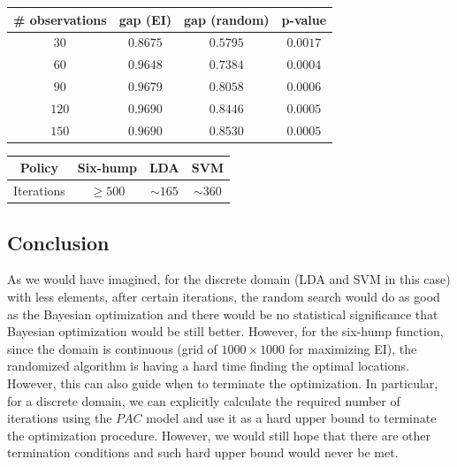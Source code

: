 \documentclass[12pt,a4paper]{article}
\begin{document}
\begin{center}
\begin{tabular}{|c|c|c|c|}
\hline
\# observations & gap (EI) & gap (random) & p-value \\
\hline
 $30$ & $0.8675$ & $0.5795$ & $0.0017$ \\
\hline
 $60$ & $0.9648$ & $0.7384$ & $0.0004$ \\
\hline
 $90$ & $0.9679$ & $0.8058$ & $0.0006$ \\
\hline
$120$ & $0.9690$ & $0.8446$ & $0.0005$ \\
\hline
$150$ & $0.9690$ & $0.8530$ & $0.0005$ \\
\hline
\end{tabular}
\end{center}

\begin{center}
\begin{tabular}{|c|c|c|c|}
\hline
Policy & Six-hump & LDA & SVM \\
\hline
Iterations & $\geq500$ & $\sim165$ & $\sim360$ \\
\hline
\end{tabular}
\end{center}

\subsection{Conclusion}
As we would have imagined, for the discrete domain (LDA and SVM in this case) with less elements, after certain iterations, the random search would do as good as the Bayesian optimization and there would be no statistical significance that Bayesian optimization would be still better. However, for the six-hump function, since the domain is continuous (grid of $1000\times1000$ for maximizing EI), the randomized algorithm is having a hard time finding the optimal locations. \\
However, this can also guide when to terminate the optimization. In particular, for a discrete domain, we can explicitly calculate the required number of iterations using the $PAC$ model and use it as a hard upper bound to terminate the optimization procedure. However, we would still hope that there are other termination conditions and such hard upper bound would never be met.
\end{document}
